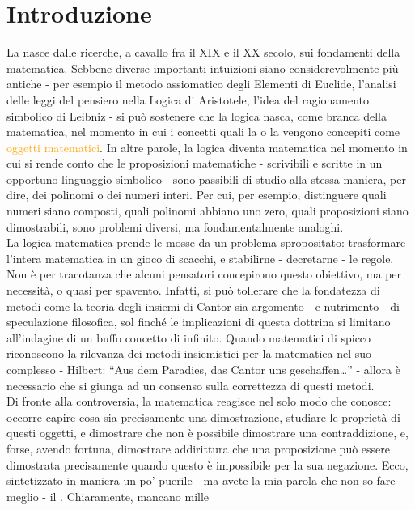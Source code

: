 \section{Introduzione}
La  nasce dalle ricerche, a cavallo fra il XIX e il XX secolo, sui fondamenti della matematica. Sebbene diverse importanti intuizioni siano considerevolmente più antiche - per esempio il 
metodo assiomatico degli Elementi di Euclide, l'analisi delle leggi del pensiero nella Logica di Aristotele, l'idea del ragionamento simbolico di Leibniz - si può sostenere che la logica nasca, come branca della matematica, nel momento 
in cui i concetti quali la  o la  vengono concepiti come \textcolor{orange}{oggetti matematici}. In altre parole, la logica diventa matematica nel momento in cui si rende conto che 
le proposizioni matematiche - scrivibili e scritte in un opportuno linguaggio simbolico - sono passibili di studio alla stessa maniera, per dire, dei polinomi o dei numeri interi. Per cui, per esempio,
distinguere quali numeri siano composti, quali polinomi abbiano uno zero, quali proposizioni siano dimostrabili, sono problemi diversi, ma fondamentalmente analoghi.\\
La logica matematica prende le mosse da un problema spropositato: trasformare l'intera matematica in un gioco di scacchi, e stabilirne - decretarne - le regole. Non è per tracotanza che alcuni pensatori concepirono questo obiettivo, ma per necessità, o quasi per spavento.
Infatti, si può tollerare che la fondatezza  di metodi come la teoria degli insiemi di Cantor sia argomento - e nutrimento - di speculazione filosofica, sol finché le implicazioni di questa dottrina si limitano all'indagine di un buffo concetto di infinito.
Quando matematici di spicco riconoscono la rilevanza dei metodi insiemistici per la matematica nel suo complesso - Hilbert: ``Aus dem Paradies, das Cantor uns geschaffen\ldots'' - allora è necessario che si giunga ad un consenso sulla correttezza di questi metodi.\\
Di fronte alla controversia, la matematica reagisce nel solo modo che conosce: occorre capire cosa sia precisamente una dimostrazione, studiare le proprietà di questi oggetti, e dimostrare che non è possibile dimostrare una contraddizione, e, forse, avendo fortuna, 
dimostrare addirittura che una proposizione può essere dimostrata precisamente quando questo è impossibile per la sua negazione. Ecco, sintetizzato in maniera un po' puerile - ma avete la mia parola che non so fare meglio - il . Chiaramente, mancano mille
